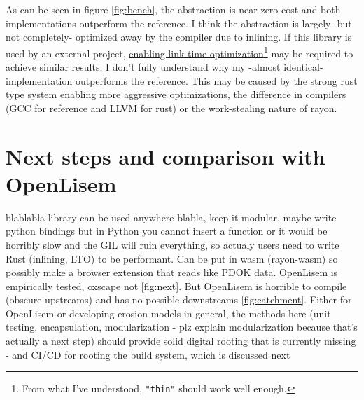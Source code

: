 \documentclass[a4paper]{article} %
\begin{document}
As can be seen in figure \ref{fig:bench}, the abstraction is near-zero cost and both implementations outperform the reference. I think the abstraction is largely -but not completely- optimized away by the compiler due to inlining. If this library is used by an external project, \href{https://nnethercote.github.io/perf-book/build-configuration.html\#link-time-optimization}{enabling link-time optimization}\footnote{From what I've understood, \texttt{"thin"} should work well enough.} may be required to achieve similar results. I don't fully understand why my -almost identical- implementation outperforms the reference. This may be caused by the strong rust type system enabling more aggressive optimizations, the difference in compilers (GCC for reference and LLVM for rust) or the work-stealing nature of rayon.

\section{Next steps and comparison with OpenLisem}

blablabla library can be used anywhere blabla, keep it modular, maybe write python bindings but in Python you cannot insert a function or it would be horribly slow and the GIL will ruin everything, so actualy users need to write Rust (inlining, LTO) to be performant. Can be put in wasm (rayon-wasm) so possibly make a browser extension that reads like PDOK data. OpenLisem is empirically tested, oxscape not \ref{fig:next}. But OpenLisem is horrible to compile (obscure upstreams) and has no possible downstreams \ref{fig:catchment}. Either for OpenLisem or developing erosion models in general, the methods here (unit testing, encapsulation, modularization - plz explain modularization because that's actually a next step) should provide solid digital rooting that is currently missing - and CI/CD for rooting the build system, which is discussed next








\end{document}

